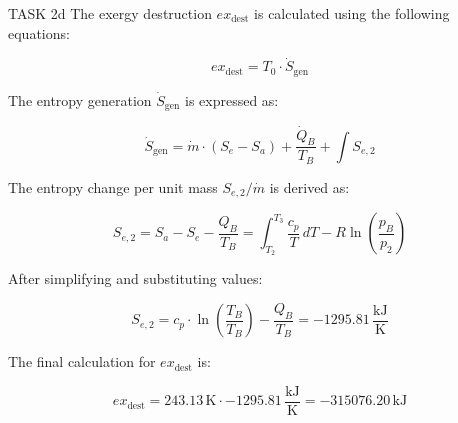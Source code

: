 TASK 2d  
The exergy destruction \( ex_{\text{dest}} \) is calculated using the following equations:

\[
ex_{\text{dest}} = T_0 \cdot \dot{S}_{\text{gen}}
\]

The entropy generation \( \dot{S}_{\text{gen}} \) is expressed as:

\[
\dot{S}_{\text{gen}} = \dot{m} \cdot (S_e - S_a) + \frac{\dot{Q}_B}{T_B} + \int S_{e,2}
\]

The entropy change per unit mass \( S_{e,2} / \dot{m} \) is derived as:

\[
S_{e,2} = S_a - S_e - \frac{Q_B}{T_B} = \int_{T_2}^{T_3} \frac{c_p}{T} \, dT - R \ln\left(\frac{p_B}{p_2}\right)
\]

After simplifying and substituting values:

\[
S_{e,2} = c_p \cdot \ln\left(\frac{T_B}{T_B}\right) - \frac{Q_B}{T_B} = -1295.81 \, \frac{\text{kJ}}{\text{K}}
\]

The final calculation for \( ex_{\text{dest}} \) is:

\[
ex_{\text{dest}} = 243.13 \, \text{K} \cdot -1295.81 \, \frac{\text{kJ}}{\text{K}} = -315076.20 \, \text{kJ}
\]